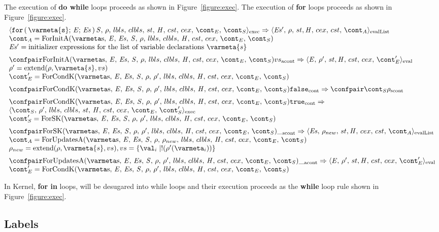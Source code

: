 \documentclass{article}
\DeclareMathOperator{\extend}{extend}
\begin{document}
The execution of \textbf{do while} loops proceeds as shown in Figure~\ref{figure:exec}.
The execution of \textbf{for} loops proceeds as shown in Figure~\ref{figure:exec}.
\[
 \begin{array}{l}
	\execconf{\ForStatement{\varmeta{s}}{\expressionmeta}{\exprs}{\statementmeta}}{\env}{\lbls}{\clbls}{\handler}{\cstrace}{\cex}{\econt}{\scont}
	\Rightarrow
	\evallistconf{\exprs'}{\env}{\strace}{\cex}{\cstrace}{\acont} \\
	\acont = \ForInitA \\
	\exprs' = \text{initializer expressions for the list of variable declarations }\varmeta{s}
	\\[2mm]

	\acontconf{\ForInitA}{\vals}
	\Rightarrow
	\evalconf{\expressionmeta}{\env'}{\strace}{\cstrace}{\cex}{\econt'} \\
	\env' = \extend(\env, \varmeta{s}, \vals) \\
	\econt' = \ForCondK
	\\[2mm]

	\contconf{\ForCondK}{\tt{false}}
	\Rightarrow
	\scontconf{\scont}{\env}
	\\[2mm]

	\contconf{\ForCondK}{\tt{true}}
	\Rightarrow \\
	\execconf{\scont}{\env'}{\lbls}{\clbls}{\handler}{\cstrace}{\cex}{\econt}{\scont'} \\
	\scont' = \ForSK
	\\[2mm]

	\scontconf{\ForSK}{\_}
	\Rightarrow
	\evallistconf{\exprs}{\env_{new}}{st}{cex}{cst}{\acont} \\
	\acont = \ForUpdatesA{\env_{new}} \\
	\env_{new} = \extend(\env, \varmeta{s}, \vals), \vals = \{\val_i \mid \deref(\env'(\varmeta_i))\}
	\\[2mm]

	\acontconf{\ForUpdatesA{\env'}}{\_}
	\Rightarrow
	\evalconf{\expressionmeta}{\env'}{\strace}{\cstrace}{\cex}{\econt'}\\
	\econt' = \ForCondK
 \end{array}
\]

In Kernel, \textbf{for in} loops, will be desugared into while loops and their execution proceeds as the \textbf{while} loop rule shown in Figure~\ref{figure:exec}.
\subsection{Labels}
\end{document}
